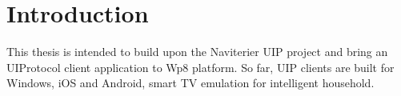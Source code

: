 \chapter{Introduction}
This thesis is intended to build upon the Naviterier UIP project and bring an UIProtocol client application to Wp8 platform. So far, UIP clients are built for Windows, iOS and Android, smart TV emulation for intelligent household.
